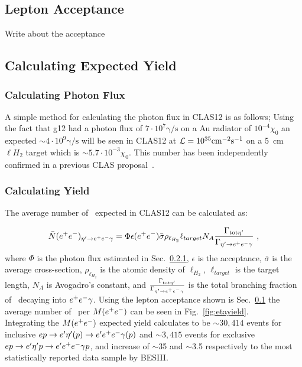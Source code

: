 \subsection{Lepton Acceptance}\label{sec.acceptance}
Write about the acceptance
\subsection{Calculating Expected Yield}
\subsubsection{Calculating Photon Flux}\label{sec:calflux}
A simple method for calculating the photon flux in CLAS12 is as follows; Using the fact that g12 had a photon flux of $7\cdot 10^7 \mathrm{\gamma/s}$ on a Au radiator of $10^{-4} \chi_0$ an expected $\sim 4\cdot 10^9  \mathrm{\gamma/s}$ will be seen in CLAS12 at ${\cal L} = 10^{35}\mathrm{cm^{-2}s^{-1}}$ on a 5~cm $\ell H_2$ target which is $\sim 5.7\cdot 10^{-3} \chi_0$. This number has been independently confirmed in a previous CLAS proposal~\cite{clas.proposal.meson}.
\subsubsection{Calculating Yield}
The average number of \etaDal \ expected in CLAS12 can be calculated as:

\begin{align}
\bar{N}(e^+e^-)_{\eta^{\prime} \to e^+e^- \gamma} = \Phi \epsilon(e^+e^-)\bar{\sigma} \rho_{\ell_{H_2}}\ell_{target}N_A \frac{\Gamma_{\mathrm{tot} \eta^{\prime}}}{\Gamma_{\eta^{\prime} \to e^+e^- \gamma}}\ ,
\end{align}
where $\Phi$ is the photon flux estimated in Sec.~\ref{sec:calflux}, $\epsilon$ is the acceptance, $\bar{\sigma}$ is the average cross-section, $\rho_{\ell_{H_2}}$ is the atomic density of $\ell_{H_2}$, $\ell_{target}$ is the target length, $N_A$ is Avogadro's constant, and $\frac{\Gamma_{\mathrm{tot} \eta^{\prime}}}{\Gamma_{\eta^{\prime} \to e^+e^- \gamma}}$ is the total branching fraction of \etaTP \  decaying into $e^+e^- \gamma$.
Using the lepton acceptance shown is Sec.~\ref{sec.acceptance} the average number of \etaTP \  per $M(e^+e^-)$ can be seen in Fig.~\ref{fig:etayield}.
\label{fig:etayield}\\
Integrating the $M(e^+e^-)$ expected yield calculates to be $\sim 30,414$ events for inclusive $ep\to e'\eta^{\prime} (p) \to e'e^+e^- \gamma(p)$ and $\sim 3,415$ events for exclusive $ep\to e'\eta^{\prime} p \to e'e^+e^- \gamma p$, and increase of $\sim$35 and $\sim$3.5 respectively to the most statistically reported data sample by BESIII. 
